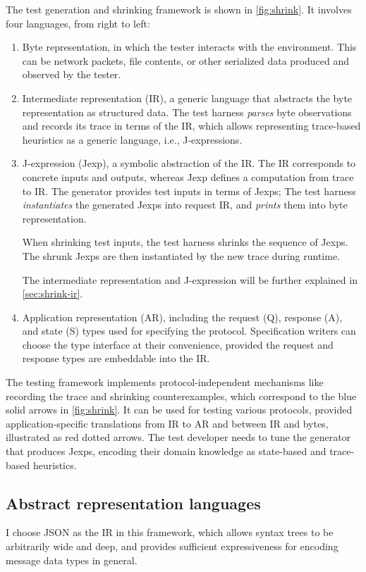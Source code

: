 The test generation and shrinking framework is shown in \autoref{fig:shrink}.
It involves four languages, from right to left:
\begin{enumerate}
  \item Byte representation, in which the tester interacts with the environment.
    This can be network packets, file contents, or other serialized data
    produced and observed by the tester.
  \item Intermediate representation (IR), a generic language that abstracts the
    byte representation as structured data.  The test harness {\em parses} byte
    observations and records its trace in terms of the IR, which allows
    representing trace-based heuristics as a generic language, i.e.,
    J-expressions.
  \item J-expression (Jexp), a symbolic abstraction of the IR.  The IR
    corresponds to concrete inputs and outputs, whereas Jexp defines a
    computation from trace to IR.  The generator provides test inputs in terms
    of Jexps; The test harness {\em instantiates} the generated Jexps into
    request IR, and {\em prints} them into byte representation.

    When shrinking test inputs, the test harness shrinks the sequence of Jexps.
    The shrunk Jexps are then instantiated by the new trace during runtime.

    The intermediate representation and J-expression will be further explained
    in \autoref{sec:shrink-ir}.
  \item Application representation (AR), including the request (\ilc Q),
    response (\ilc A), and state (\ilc S) types used for specifying the
    protocol.  Specification writers can choose the type interface at their
    convenience, provided the request and response types are embeddable into the
    IR.
\end{enumerate}

The testing framework implements protocol-independent mechanisms like recording
the trace and shrinking counterexamples, which correspond to the blue solid
arrows in \autoref{fig:shrink}.  It can be used for testing various protocols,
provided application-specific translations from IR to AR and between IR and
bytes, illustrated as red dotted arrows.  The test developer needs to tune the
generator that produces Jexps, encoding their domain knowledge as state-based
and trace-based heuristics.

\subsection{Abstract representation languages}
\label{sec:shrink-ir}
I choose JSON as the IR in this framework, which allows syntax trees to be
arbitrarily wide and deep, and provides sufficient expressiveness for encoding
message data types in general.

